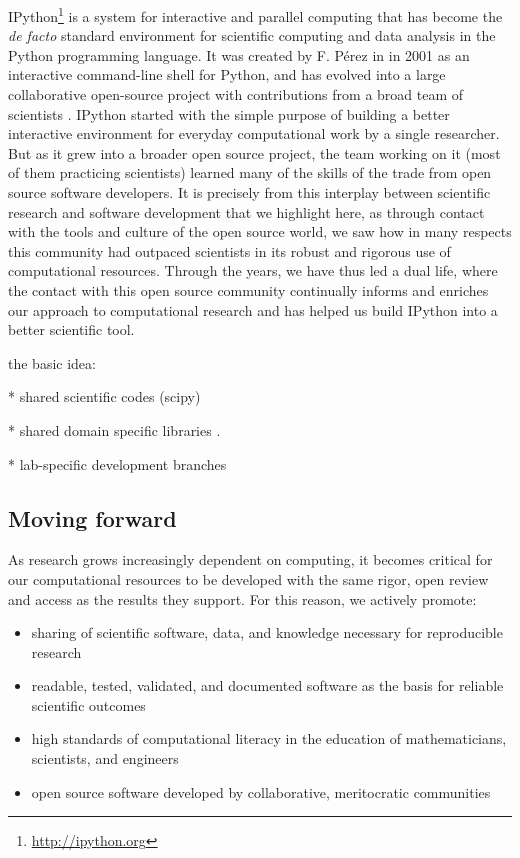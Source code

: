 \documentclass[ChapterTOCs,krantz2]{krantz} %
\theoremstyle{definition}
\begin{document}
IPython\footnote{\url{http://ipython.org}} is a system for interactive and
parallel computing that has become the \emph{de facto} standard environment for
scientific computing and data analysis in the Python programming language.  It
was created by F. Pérez in in 2001 as an interactive command-line shell for
Python, and has evolved into a large collaborative open-source project with
contributions from a broad team of scientists \cite{PER-GRA:2007}.  IPython
started with the simple purpose of building a better interactive environment
for everyday computational work by a single researcher.  But as it grew into a
broader open source project, the team working on it (most of them practicing
scientists) learned many of the skills of the trade from open source software
developers.  It is precisely from this interplay between scientific research
and software development that we highlight here, as through contact with the
tools and culture of the open source world, we saw how in many respects this
community had outpaced scientists in its robust and rigorous use of
computational resources.  Through the years, we have thus led a dual life,
where the contact with this open source community continually informs and
enriches our approach to computational research and has helped us build IPython
into a better scientific tool.


the basic idea:

* shared scientific codes (scipy)

* shared domain specific libraries \cite{nipy_cise}.

* lab-specific development branches

\subsection{Moving forward}

As research grows increasingly dependent on computing, it becomes critical
for our computational resources to be developed with the same rigor, open review
and access as the results they support.  For this reason, we actively promote:

\begin{itemize}

\item sharing of scientific software, data, and knowledge necessary for
reproducible research

\item readable, tested, validated, and documented software as the basis for
reliable scientific outcomes

\item high standards of computational literacy in the education of
mathematicians, scientists, and engineers

\item open source software developed by collaborative, meritocratic
communities

\end{itemize}
\end{document}
